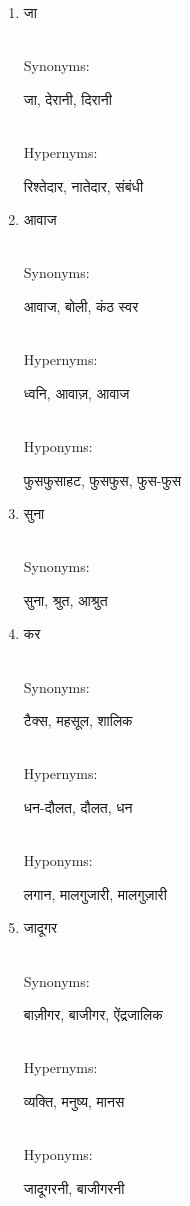 \documentclass{article}
\begin{document}
\begin{enumerate}
\item \begin{hindi}जा\end{hindi} \\
Synonyms: \begin{hindi}जा, देरानी, दिरानी\end{hindi} \\
Hypernyms: \begin{hindi}रिश्तेदार, नातेदार, संबंधी\end{hindi}

\item \begin{hindi}आवाज\end{hindi} \\
Synonyms: \begin{hindi}आवाज, बोली, कंठ स्वर\end{hindi} \\
Hypernyms: \begin{hindi}ध्वनि, आवाज़, आवाज\end{hindi} \\
Hyponyms: \begin{hindi}फुसफुसाहट, फुसफुस, फुस-फुस\end{hindi}

\item \begin{hindi}सुना\end{hindi} \\
Synonyms: \begin{hindi}सुना, श्रुत, आश्रुत\end{hindi}

\item \begin{hindi}कर\end{hindi} \\
Synonyms: \begin{hindi}टैक्स, महसूल, शालिक\end{hindi} \\
Hypernyms: \begin{hindi}धन-दौलत, दौलत, धन\end{hindi} \\
Hyponyms: \begin{hindi}लगान, मालगुजारी, मालगुज़ारी\end{hindi}

\item \begin{hindi}जादूगर\end{hindi} \\
Synonyms: \begin{hindi}बाज़ीगर, बाजीगर, ऐंद्रजालिक\end{hindi} \\
Hypernyms: \begin{hindi}व्यक्ति, मनुष्य, मानस\end{hindi} \\
Hyponyms: \begin{hindi}जादूगरनी, बाजीगरनी\end{hindi}


\end{enumerate}
\end{document}
